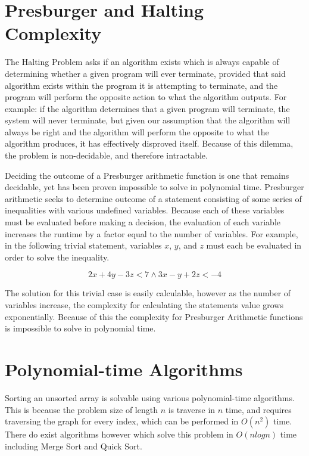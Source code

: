 \documentclass{article}
\renewcommand{\_}{\ifincsname_\else\legacyunderscore\fi}
\begin{document}
\section*{Presburger and Halting Complexity}

The Halting Problem asks if an algorithm exists which is always capable of determining whether a given program will ever terminate, provided that said algorithm exists within the program it is attempting to terminate, and the program will perform the opposite action to what the algorithm outputs. For example: if the algorithm determines that a given program will terminate, the system will never terminate, but given our assumption that the algorithm will always be right and the algorithm will perform the opposite to what the algorithm produces, it has effectively disproved itself. Because of this dilemma, the problem is non-decidable, and therefore intractable.

Deciding the outcome of a Presburger arithmetic function is one that remains decidable, yet has been proven impossible to solve in polynomial time. Presburger arithmetic seeks to determine outcome of a statement consisting of some series of inequalities with various undefined variables. Because each of these variables must be evaluated before making a decision, the evaluation of each variable increases the runtime by a factor equal to the number of variables. For example, in the following trivial statement, variables $x$, $y$, and $z$ must each be evaluated in order to solve the inequality.

\begin{equation}
    2x+4y-3z < 7 \wedge 3x-y+2z < -4
\end{equation}

The solution for this trivial case is easily calculable, however as the number of variables increase, the complexity for calculating the statements value grows exponentially. Because of this the complexity for Presburger Arithmetic functions is impossible to solve in polynomial time.

\section*{Polynomial-time Algorithms}

Sorting an unsorted array is solvable using various polynomial-time algorithms. This is because the problem size of length $n$ is traverse in $n$ time, and requires traversing the graph for every index, which can be performed in $O(n^2)$ time. There do exist algorithms however which solve this problem in $O(n log n)$ time including Merge Sort and Quick Sort.
\end{document}

